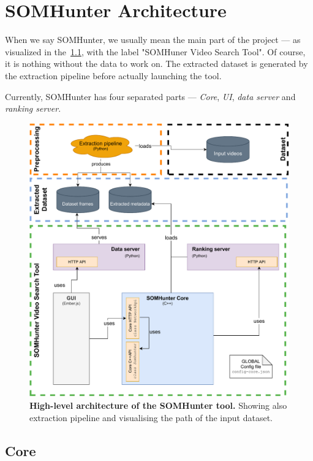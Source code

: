 \chapter{SOMHunter Architecture}
\label{arch}


When we say SOMHunter, we usually mean the main part of the project --- as visualized in the~\cref{fig:sh-arch}, with the label "SOMHuner Video Search Tool". Of course, it is nothing without the data to work on. The extracted dataset is generated by the extraction pipeline before actually launching the tool.

Currently, SOMHunter has four separated parts --- \emph{Core}, \emph{UI}, \emph{data server} and \emph{ranking server}.


\begin{figure}[h]
	\centering
	\includegraphics[width=1.0\textwidth]{img/diagrams/sh-arch.pdf}
	\caption{\textbf{High-level architecture of the SOMHunter tool.} Showing also extraction pipeline and visualising the path of the input dataset.}
	\label{fig:sh-arch}
\end{figure}

\section{Core}

